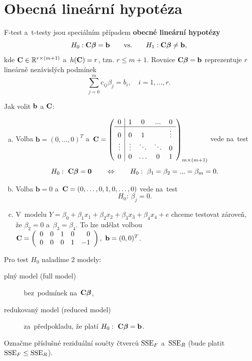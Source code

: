 \section{Obecná lineární hypotéza}
F-test a~t-testy jsou speciálním případem \textbf{obecné lineární hypotézy}
 $$ H_0: \textbf{C}\boldsymbol{\beta} = \textbf{b} \qquad\text{vs.}\qquad H_1: \textbf{C}\boldsymbol{\beta}\neq\textbf{b}, $$
kde $\textbf{C}\in\mathbb{R}^{r\times(m+1)}$ a~$h(\textbf{C}) = r$, tzn. $r\leq m+1$. Rovnice $\textbf{C}\boldsymbol{\beta} = \textbf{b}$ reprezentuje $r$ lineárně nezávislých podmínek
 $$ \sum_{j = 0}^m c_{ij}\beta_j = b_i,\quad i = 1,\dots,r. $$
\begin{remark}
	Jak volit $\mathbf{b}$ a $\textbf{C}$:
	
	\begin{enumerate}[a)]
		\item Volba $\textbf{b} = (0,\dots,0)^T$ a~$ \textbf{C} = \left(\begin{array}{c|cccc}
		0 & 1 & 0 &... & 0 \\\hline
		0 & 0 & 1 &  & \vdots \\
		\vdots& \vdots & \ddots & \ddots & 0 \\
		0 & 0 & \dots & 0 & 1
		\end{array}
		\right)_{m\times(m+1)} $ vede na~test
		 $$ H_0:~\textbf{C}\boldsymbol{\beta} = \boldsymbol{0}\qquad\Leftrightarrow\qquad H_0:~\beta_1 = \beta_2 = ... = \beta_m = 0. $$
		\item Volba $\textbf{b} = 0$ a~$\textbf{C} = (0,\dots,0,1,0,\dots,0)$ vede na~test
		 $$ H_0:~\beta_j = 0. $$
		\item V~modelu $Y = \beta_0+\beta_1x_1+\beta_2x_2+\beta_3x_3+\beta_4x_4+e$ chceme testovat zároveň, že $\beta_2 = 0$ a~$\beta_3 = \beta_4$. To lze udělat volbou $ \textbf{C} = \left(\begin{array}{rrrrr}
		0 & 0 & 1 & 0 & 0 \\
		0 & 0 & 0 & 1 & -1
		\end{array}
		 \right),~\textbf{b} = (0,0)^T $.
	\end{enumerate}
\end{remark}

Pro test $H_0$ naladíme 2 modely:\begin{description}
\item[plný model (full model)] bez~podmínek na~$\textbf{C}\boldsymbol{\beta}$,
\item[redukovaný model (reduced model)] za~předpokladu, že platí $H_0:~\textbf{C}\boldsymbol{\beta} = \mathbf{b}$.
\end{description}

Označme příslušné reziduální součty čtverců $\mathrm{SSE}_F$ a~$\mathrm{SSE}_R$ (bude platit $\mathrm{SSE}_F\leq\mathrm{SSE}_R$).

